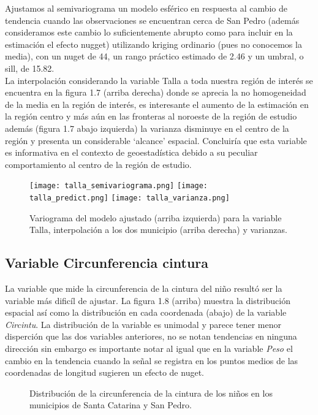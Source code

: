 \documentclass[paper=letter, fontsize=11pt]{scrartcl}
\numberwithin{equation}{section} %
\numberwithin{figure}{section} %
\numberwithin{table}{section} %
\begin{document}
\begin{enumerate}
\begin{enumerate}
Ajustamos al semivariograma un modelo esférico en respuesta al cambio de tendencia cuando las observaciones se encuentran cerca de San Pedro (además consideramos este cambio lo suficientemente abrupto como para incluir en la estimación el efecto nugget) utilizando kriging ordinario (pues no conocemos la media), con un nuget de 44, un rango práctico estimado de 2.46 y un umbral, o sill, de 15.82.\\

La interpolación considerando la variable Talla a toda nuestra región de interés se encuentra en la figura 1.7 (arriba derecha) donde se aprecia la no homogeneidad de la media en la región de interés, es interesante el aumento de la estimación en la región centro y más aún en las fronteras al noroeste de la región de estudio además (figura 1.7 abajo izquierda) la varianza disminuye en el centro de la región y presenta un considerable ‘alcance’ espacial. Concluiría que esta variable es informativa en el contexto de geoestadística debido a su peculiar comportamiento al centro de la región de estudio.



\begin{figure}[htbp]
\texttt{[image: talla\_semivariograma.png]}
\texttt{[image: talla\_predict.png]}
\texttt{[image: talla\_varianza.png]}
\caption{Variograma del modelo ajustado (arriba izquierda) para la variable Talla, interpolación a los dos municipio (arriba derecha) y varianzas.}
\label{img1}
\end{figure}
\FloatBarrier

\subsection*{Variable Circunferencia cintura}


La variable que mide la circunferencia de la cintura del niño resultó ser la variable más dificíl de ajustar. La figura 1.8 (arriba) muestra la distribución espacial así como la distribución en cada coordenada (abajo) de la variable \textit{Circintu}. La distribución de la variable es unimodal y parece tener menor disperción que las dos variables anteriores, no se notan tendencias en ninguna dirección sin embargo es importante notar al igual que en la variable \textit{Peso} el cambio en la tendencia cuando la señal se registra en los puntos medios de las coordenadas de longitud sugieren un efecto de nuget. \\
 
\begin{figure}[htbp]
\caption{Distribución de la circunferencia de la cintura de los niños en los municipios de Santa Catarina y San Pedro.}
\label{img1}
\end{figure}
\FloatBarrier
 

\end{enumerate}
\end{enumerate}
\end{document}
